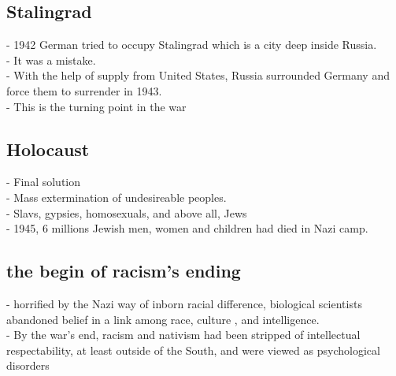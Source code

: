 \documentclass{article}
\begin{document}
\subsection { Stalingrad}
- 1942 German tried to occupy Stalingrad which is a city deep inside Russia. \\
- It was a mistake. \\
- With the help of supply from United States, Russia surrounded Germany and force them to surrender in 1943. \\
- This is the turning point in the war\\

\subsection{ Holocaust}
- Final solution\\
- Mass extermination of undesireable peoples.\\
- Slavs, gypsies, homosexuals, and above all, Jews\\
- 1945, 6 millions Jewish men, women and children had died in Nazi camp.\\

\subsection { the begin of racism's ending}
- horrified by the Nazi way of inborn racial difference, biological scientists abandoned belief in a link among race, culture , and intelligence.\\
- By the war's end, racism and nativism had been stripped of intellectual respectability, at least outside of the South, and were viewed as psychological disorders\\
\end{document}

